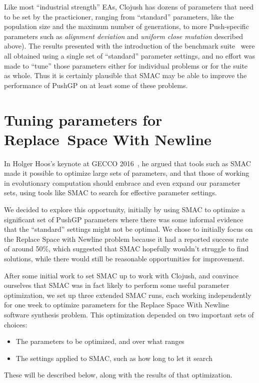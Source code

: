 Like most ``industrial
strength'' EAs, Clojush has dozens of parameters that need to be set by the
practicioner, ranging from ``standard'' parameters, like the population size
and the maximum number of generations, to more Push-specific parameters
such as \emph{alignment deviation} and \emph{uniform close mutation} 
described above). The results presented with the introduction of the
benchmark suite~\cite{Helmuth:2015:GECCO} were all obtained using a single
set of ``standard'' parameter settings, and no effort was made to ``tune''
those parameters either for individual problems or for the suite as whole.
Thus it is certainly plausible that SMAC may be able to improve the performance of PushGP on at least some of these problems.

\section{Tuning parameters for Replace~Space With Newline}
\label{sec:tuningRSWN}

In Holger Hoos's keynote at GECCO 
2016~\cite{Hoos:2016:TCM:2908812.2908960}, he argued that tools such as
SMAC made it possible to optimize large sets of parameters, and that those
of working in evolutionary computation should embrace and even expand
our parameter sets, using tools like SMAC to search for effective parameter
settings.

We decided to explore this opportunity, initially by using SMAC to optimize
a significant set of PushGP parameters where there was some informal
evidence that the ``standard'' settings might not be optimal. We chose to
initially focus on the Replace Space with Newline problem because it had a
reported success rate of around 50\%, which suggested that SMAC hopefully
wouldn't struggle to find solutions, while there would still be reasonable
opportunities for improvement.

After some initial work to set SMAC up to work with Clojush, and convince
ourselves that SMAC was in fact likely to perform some useful parameter
optimization, we set up three extended SMAC runs, each working independently
for one week to optimize parameters for the Replace Space With Newline software synthesis problem.
This optimization depended on two important sets of choices:
\begin{itemize}
	\item The parameters to be optimized, and over what ranges
	\item The settings applied to SMAC, such as how long to let it search
\end{itemize}
These will be described below, along with the results of that optimization.

